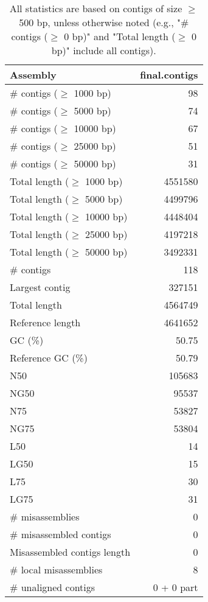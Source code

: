 \documentclass[12pt,a4paper]{article}
\begin{document}
\begin{table}[ht]
\begin{center}
\caption{All statistics are based on contigs of size $\geq$ 500 bp, unless otherwise noted (e.g., "\# contigs ($\geq$ 0 bp)" and "Total length ($\geq$ 0 bp)" include all contigs).}
\begin{tabular}{|l*{1}{|r}|}
\hline
Assembly & final.contigs \\ \hline
\# contigs ($\geq$ 1000 bp) & 98 \\ \hline
\# contigs ($\geq$ 5000 bp) & 74 \\ \hline
\# contigs ($\geq$ 10000 bp) & 67 \\ \hline
\# contigs ($\geq$ 25000 bp) & 51 \\ \hline
\# contigs ($\geq$ 50000 bp) & 31 \\ \hline
Total length ($\geq$ 1000 bp) & 4551580 \\ \hline
Total length ($\geq$ 5000 bp) & 4499796 \\ \hline
Total length ($\geq$ 10000 bp) & 4448404 \\ \hline
Total length ($\geq$ 25000 bp) & 4197218 \\ \hline
Total length ($\geq$ 50000 bp) & 3492331 \\ \hline
\# contigs & 118 \\ \hline
Largest contig & 327151 \\ \hline
Total length & 4564749 \\ \hline
Reference length & 4641652 \\ \hline
GC (\%) & 50.75 \\ \hline
Reference GC (\%) & 50.79 \\ \hline
N50 & 105683 \\ \hline
NG50 & 95537 \\ \hline
N75 & 53827 \\ \hline
NG75 & 53804 \\ \hline
L50 & 14 \\ \hline
LG50 & 15 \\ \hline
L75 & 30 \\ \hline
LG75 & 31 \\ \hline
\# misassemblies & 0 \\ \hline
\# misassembled contigs & 0 \\ \hline
Misassembled contigs length & 0 \\ \hline
\# local misassemblies & 8 \\ \hline
\# unaligned contigs & 0 + 0 part \\ \hline

\end{tabular}
\end{center}
\end{table}
\end{document}
